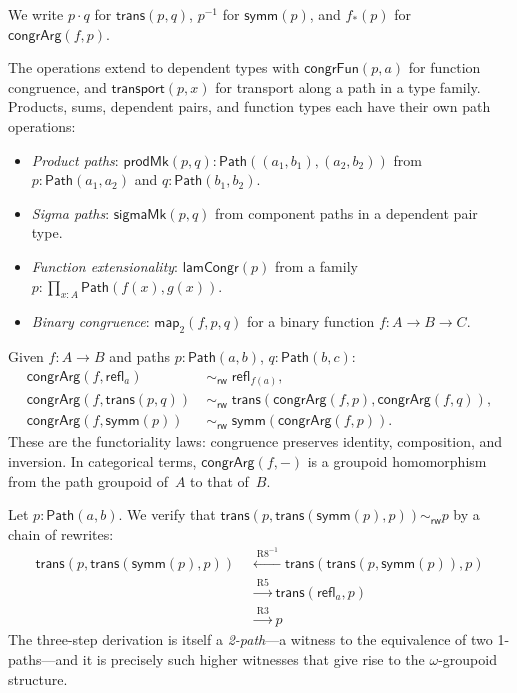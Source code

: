 \documentclass[manuscript]{BSLstyle}
\newcommand{\Path}{\mathsf{Path}}
\newcommand{\refl}{\mathsf{refl}}
\newcommand{\symm}{\mathsf{symm}}
\newcommand{\trans}{\mathsf{trans}}
\newcommand{\congrArg}{\mathsf{congrArg}}
\newcommand{\congrFun}{\mathsf{congrFun}}
\newcommand{\transport}{\mathsf{transport}}
\newcommand{\rweq}{\sim_{\mathsf{rw}}}
\begin{document}
\begin{notation}
We write $p \cdot q$ for $\trans(p, q)$, $p^{-1}$ for $\symm(p)$,
and $f_*(p)$ for $\congrArg(f, p)$.
\end{notation}

The operations extend to dependent types with $\congrFun(p, a)$ for
function congruence, and $\transport(p, x)$ for transport along a path
in a type family.  Products, sums, dependent pairs, and function types
each have their own path operations:

\begin{itemize}
\item \emph{Product paths}: $\mathsf{prodMk}(p, q) : \Path((a_1, b_1), (a_2, b_2))$
  from $p : \Path(a_1, a_2)$ and $q : \Path(b_1, b_2)$.
\item \emph{Sigma paths}: $\mathsf{sigmaMk}(p, q)$ from component paths
  in a dependent pair type.
\item \emph{Function extensionality}: $\mathsf{lamCongr}(p)$ from a family
  $p : \prod_{x:A} \Path(f(x), g(x))$.
\item \emph{Binary congruence}: $\mathsf{map}_2(f, p, q)$ for a binary
  function $f : A \to B \to C$.
\end{itemize}

\begin{example}\label{ex:congruence-functor}
Given $f : A \to B$ and paths $p : \Path(a, b)$, $q : \Path(b, c)$:
\begin{align*}
\congrArg(f, \refl_a) &\;\rweq\; \refl_{f(a)}, \\
\congrArg(f, \trans(p, q)) &\;\rweq\; \trans(\congrArg(f, p), \congrArg(f, q)), \\
\congrArg(f, \symm(p)) &\;\rweq\; \symm(\congrArg(f, p)).
\end{align*}
These are the functoriality laws: congruence preserves identity,
composition, and inversion.  In categorical terms, $\congrArg(f, -)$
is a groupoid homomorphism from the path groupoid of~$A$ to that of~$B$.
\end{example}

\begin{example}\label{ex:compound}
Let $p : \Path(a, b)$.  We verify that
$\trans(p, \trans(\symm(p), p)) \rweq p$ by a chain of rewrites:
\begin{align*}
\trans(p, \trans(\symm(p), p))
  &\;\xleftarrow{\;\text{R8}^{-1}\;}
  \trans(\trans(p, \symm(p)), p) \\
  &\;\xrightarrow{\;\text{R5}\;}
  \trans(\refl_a, p) \\
  &\;\xrightarrow{\;\text{R3}\;}
  p
\end{align*}
The three-step derivation is itself a \emph{2-path}---a witness to
the equivalence of two 1-paths---and it is precisely such higher
witnesses that give rise to the $\omega$-groupoid structure.
\end{example}
\end{document}
